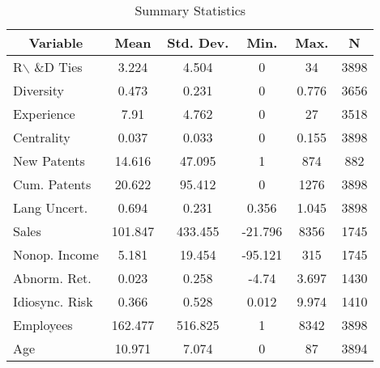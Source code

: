 
\begin{table}[htbp]\centering \caption{Summary Statistics \label{sumstat}}
\begin{tabular}{l c c c c c}\hline\hline
\multicolumn{1}{c}{\textbf{Variable}} & \textbf{Mean}
 & \textbf{Std. Dev.}& \textbf{Min.} &  \textbf{Max.} & \textbf{N}\\ \hline
R$\backslash$ \&D Ties & 3.224 & 4.504 & 0 & 34 & 3898\\
Diversity & 0.473 & 0.231 & 0 & 0.776 & 3656\\
Experience & 7.91 & 4.762 & 0 & 27 & 3518\\
Centrality & 0.037 & 0.033 & 0 & 0.155 & 3898\\
New Patents & 14.616 & 47.095 & 1 & 874 & 882\\
Cum. Patents & 20.622 & 95.412 & 0 & 1276 & 3898\\
Lang Uncert. & 0.694 & 0.231 & 0.356 & 1.045 & 3898\\
Sales & 101.847 & 433.455 & -21.796 & 8356 & 1745\\
Nonop. Income & 5.181 & 19.454 & -95.121 & 315 & 1745\\
Abnorm. Ret. & 0.023 & 0.258 & -4.74 & 3.697 & 1430\\
Idiosync. Risk & 0.366 & 0.528 & 0.012 & 9.974 & 1410\\
Employees & 162.477 & 516.825 & 1 & 8342 & 3898\\
Age & 10.971 & 7.074 & 0 & 87 & 3894\\
\hline\end{tabular}
\end{table}
